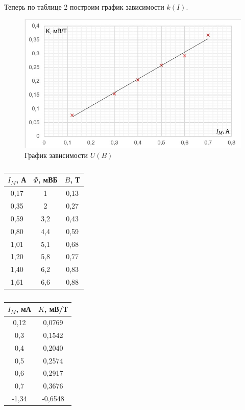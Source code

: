 \documentclass[a4paper]{article}
\theoremstyle{definition}
\theoremstyle{remark}
\begin{document}
    Теперь по таблице 2 построим график зависимости $k(I)$.

    \newpage

    \begin{figure}[h!]
        \centering
        \includegraphics[width = 320pt]{image/graph3.jpg}
        \caption{График зависимости $U(B)$}
    \end{figure}

    \begin{table}[h!]
        \caption{}
        \centering
        \begin{tabular}{|c|c|c|}
        \hline
        \multicolumn{1}{|l|}{$I_M$, А} & \multicolumn{1}{l|}{$\Phi$, мВБ} & \multicolumn{1}{l|}{$B$, Т} \\ \hline
        0,17 & 1 & 0,13 \\ \hline
        0,35 & 2 & 0,27 \\ \hline
        0,59 & 3,2 & 0,43 \\ \hline
        0,80 & 4,4 & 0,59 \\ \hline
        1,01 & 5,1 & 0,68 \\ \hline
        1,20 & 5,8 & 0,77 \\ \hline
        1,40 & 6,2 & 0,83 \\ \hline
        1,61 & 6,6 & 0,88 \\ \hline
        \end{tabular}
        \end{table}

        \begin{table}[h!]
            \caption{}
            \centering
            \begin{tabular}{|c|c|}
            \hline
            \multicolumn{1}{|l|}{{$I_M$, мА}} & \multicolumn{1}{l|}{{$K$, мВ/Т}}\\ \hline
            0,12 & 0,0769 \\ \hline
            0,3 & 0,1542 \\ \hline
            0,4 & 0,2040 \\ \hline
            0,5 & 0,2574 \\ \hline
            0,6 & 0,2917 \\ \hline
            0,7 & 0,3676 \\ \hline
            -1,34 & -0,6548 \\ \hline
            \end{tabular}
            \end{table}
\end{document}
